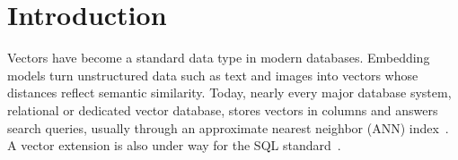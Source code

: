 
\section{Introduction}\label{sec:introduction}

Vectors have become a standard data type in modern databases.
Embedding models turn unstructured data such as text and images into vectors whose distances reflect semantic similarity. Today, nearly every major database system, relational or dedicated vector database, stores vectors in columns and answers search queries, usually through an approximate nearest neighbor (ANN) index~\cite{PgvectorRepo, OracleAIVectorSearch, SQLServer2025Vector, SQLServerVectorIndex, MySQLHeatWaveVector, SnowflakeVector, BigQueryVectorSearch, AlloyDBScaNN, ClickHouseVSS, DuckDBVSS, WangMilvus21, PineconeDocs}.
A vector extension is also under way for the SQL standard~\cite{EisentrautSQL202y25}.

